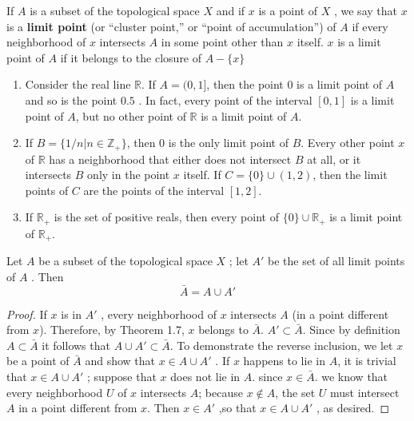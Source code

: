\documentclass[a4paper,english,12pt]{article}
\begin{document}
\begin{defn}
If $A$ is a subset of the topological space $X$ and if $x$ is a point of $X$ , we say that $x$ is a \textbf{limit point} (or “cluster point,” or “point of accumulation”) of $A$ if every neighborhood of $x$ intersects $A$ in some point other than $x$ itself.
$x$ is a limit point of $A$ if it belongs to the closure of $A - \{x\}$
\end{defn}
\begin{exmp}
\begin{enumerate}
\item Consider the real line $\mathbb{R}$. If $A = (0, 1]$, then the point $0$ is a limit point of $A$ and so is the point $0.5$ . In fact, every point of the interval $[0, 1]$ is a limit point of $A$, but no other point of $\mathbb{R}$ is a limit point of $A$.
\item If $B = \{1/n | n \in \mathbb{Z}_+\}$, then $0$ is the only limit point of $B$. Every other point $x$ of $\mathbb{R}$ has a neighborhood that either does not intersect $B$ at all, or it intersects $B$ only in the point $x$ itself. If $C = \{0\} \cup (1, 2)$, then the limit points of $C$ are the points of the interval $[1, 2]$.
\item If $\mathbb{R}_+$ is the set of positive reals, then every point of $\{0\} \cup \mathbb{R}_+$ is a limit point of $\mathbb{R}_+$.
\end{enumerate}
\end{exmp}
\begin{thm}
Let $A$ be a subset of the topological space $X$ ; let $A'$ be the set of all
limit points of $A$ . Then
\[\bar{A} = A \cup A'
\]
\begin{proof}
If $x$ is in $A'$ , every neighborhood of $x$ intersects $A$ (in a point different from $x$). Therefore, by Theorem 1.7, $x$ belongs to $\bar{A}$. $A' \subset \bar{A}$. Since by definition $A \subset \bar{A}$ it follows that $A \cup A' \subset \bar{A}$.
To demonstrate the reverse inclusion, we let $x$ be a point of $\bar{A}$ and show that
$x \in  A \cup A'$ . If $x$ happens to lie in $A$, it is trivial that $x \in A \cup A'$ ; suppose that $x$ does not lie in $A$. since $x \in  \bar{A}$. we know that every neighborhood $U$ of $x$ intersects $A$; because $x \notin A$, the set $U$ must intersect $A$ in a point different from $x$. Then $x \in  A'$ ,so that $x \in A \cup A'$ , as desired.
\end{proof}

\end{thm}
\end{document}
